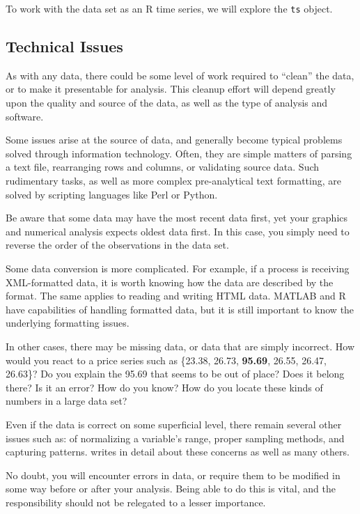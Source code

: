 To work with the data set as an R time series, we will explore the \texttt{ts} object. 

\subsection{Technical Issues}
As with any data, there could be some level of work required to ``clean'' the data, or to make it presentable for analysis.  This cleanup effort will depend greatly upon the quality and source of the data, as well as the type of analysis and software.

Some issues arise at the source of \fts{} data, and generally become typical problems solved through information technology. Often, they are simple matters of parsing a text file, rearranging rows and columns, or validating source data. Such rudimentary tasks, as well as more complex pre-analytical text formatting, are solved by scripting languages like Perl or Python.

Be aware that some \fts{} data may have the most recent data first, yet your graphics and numerical analysis expects oldest data first. In this case, you simply need to reverse the order of the observations in the data set.

Some data conversion is more complicated. For example, if a process is receiving XML-formatted data, it is worth knowing how the data are described by the format. The same applies to reading and writing HTML data. MATLAB and R have capabilities of handling formatted data, but it is still important to know the underlying formatting issues.

In other cases, there may be missing data, or data that are simply incorrect. How would you react to a price series such as \{23.38, 26.73, \textbf{95.69}, 26.55, 26.47, 26.63\}? Do you explain the 95.69 that seems to be out of place? Does it belong there? Is it an error? How do you know? How do you locate these kinds of numbers in a large data set?

Even if the data is correct on some superficial level, there remain several other issues such as: of normalizing a variable's range, proper sampling methods, and capturing patterns.  writes in detail about these concerns as well as many others.

No doubt, you will encounter errors in data, or require them to be modified in some way before or after your analysis. Being able to do this is vital, and the responsibility should not be relegated to a lesser importance.